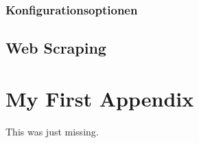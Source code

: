 \documentclass[german,bachelor]{swsLeipzig}
\begin{document}
\subsection{Konfigurationsoptionen}


\section{Web Scraping}



\appendix
\chapter{My First Appendix}
This was just missing.

\end{document}

